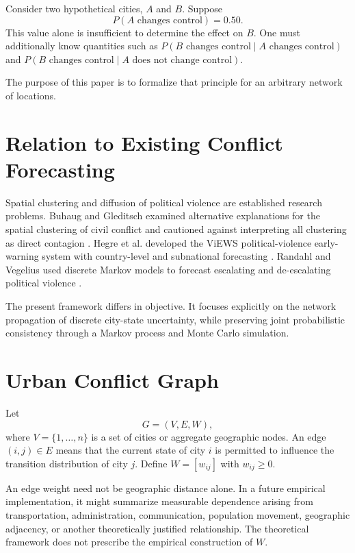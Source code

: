 \documentclass[11pt,letterpaper]{article}
\begin{document}
Consider two hypothetical cities, $A$ and $B$. Suppose
\begin{equation}
P(A\text{ changes control})=0.50.
\end{equation}
This value alone is insufficient to determine the effect on $B$. One must additionally know quantities such as $P(B\text{ changes control}\mid A\text{ changes control})$ and $P(B\text{ changes control}\mid A\text{ does not change control})$.

The purpose of this paper is to formalize that principle for an arbitrary network of locations.

\section{Relation to Existing Conflict Forecasting}
Spatial clustering and diffusion of political violence are established research problems. Buhaug and Gleditsch examined alternative explanations for the spatial clustering of civil conflict and cautioned against interpreting all clustering as direct contagion \citep{buhaug2008}. Hegre et al. developed the ViEWS political-violence early-warning system with country-level and subnational forecasting \citep{hegre2019}. Randahl and Vegelius used discrete Markov models to forecast escalating and de-escalating political violence \citep{randahl2022}.

The present framework differs in objective. It focuses explicitly on the network propagation of discrete city-state uncertainty, while preserving joint probabilistic consistency through a Markov process and Monte Carlo simulation.

\section{Urban Conflict Graph}
Let
\begin{equation}
G=(V,E,W),
\end{equation}
where $V=\{1,\ldots,n\}$ is a set of cities or aggregate geographic nodes. An edge $(i,j)\in E$ means that the current state of city $i$ is permitted to influence the transition distribution of city $j$. Define $W=[w_{ij}]$ with $w_{ij}\geq0$.

An edge weight need not be geographic distance alone. In a future empirical implementation, it might summarize measurable dependence arising from transportation, administration, communication, population movement, geographic adjacency, or another theoretically justified relationship. The theoretical framework does not prescribe the empirical construction of $W$.
\end{document}
